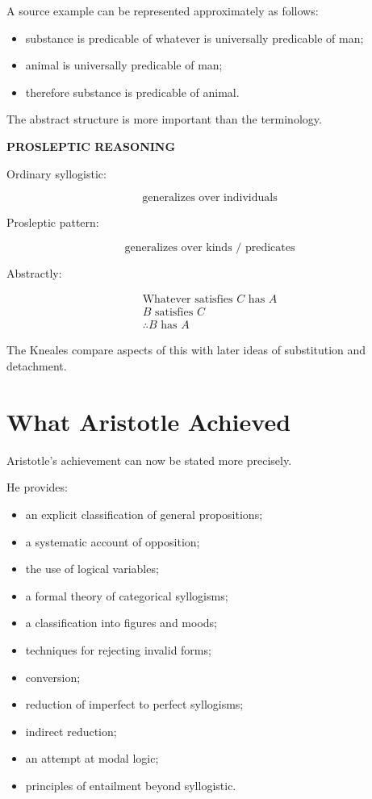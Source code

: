 \documentclass[11pt]{article}
\begin{document}
A source example can be represented approximately as follows:

\begin{itemize}
    \item substance is predicable of whatever is universally
    predicable of man;
    \item animal is universally predicable of man;
    \item therefore substance is predicable of animal.
\end{itemize}

The abstract structure is more important than the terminology.

\begin{whiteboard}
\textbf{PROSLEPTIC REASONING}

Ordinary syllogistic:

\[
\text{generalizes over individuals}
\]

Prosleptic pattern:

\[
\text{generalizes over kinds / predicates}
\]

Abstractly:

\[
\begin{array}{c}
\text{Whatever satisfies }C\text{ has }A\\
B\text{ satisfies }C\\
\hline
\therefore B\text{ has }A
\end{array}
\]
\end{whiteboard}

The Kneales compare aspects of this with later ideas of
substitution and detachment.

\section{What Aristotle Achieved}

Aristotle's achievement can now be stated more precisely.

He provides:

\begin{itemize}
    \item an explicit classification of general propositions;
    \item a systematic account of opposition;
    \item the use of logical variables;
    \item a formal theory of categorical syllogisms;
    \item a classification into figures and moods;
    \item techniques for rejecting invalid forms;
    \item conversion;
    \item reduction of imperfect to perfect syllogisms;
    \item indirect reduction;
    \item an attempt at modal logic;
    \item principles of entailment beyond syllogistic.
\end{itemize}
\end{document}
